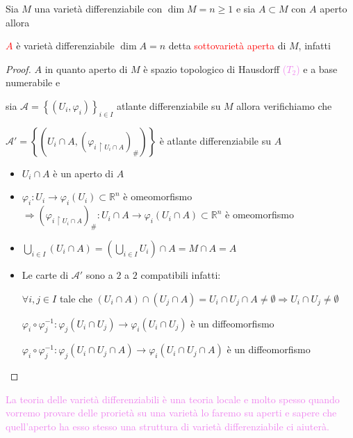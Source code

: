         \begin{esempio}
        \mbox{}

        Sia $M$ una varietà differenziabile con $\dim M =n \geq 1$ e sia $A \subset M$ con $A$ aperto allora 

        \textcolor{red}{$A$} è varietà differenziabile $\dim A = n$ detta \textcolor{red}{sottovarietà aperta} di $M$, infatti

        \begin{proof}
        \mbox{}

        $A$ in quanto aperto di $M$ è spazio topologico di Hausdorff \textcolor{violet}{($T_2$)} e a base numerabile e
        
        sia $\mathcal{A}=\left\{(U_i, \varphi_i)\right\}_{i \in I}$ atlante differenziabile su $M$ allora verifichiamo che
        
        $\mathcal{A}'= \left\{\left(U_i \cap A , (\varphi_{i \, \restriction U_i \cap A} )_\# \right) \right\}$ è atlante differenziabile su $A$
        \begin{itemize}
            \item $U_i \cap A$ è un aperto di $A$
            \item $\varphi_i \colon U_i \to \varphi_i (U_i) \subset \mathbb{R}^n$ è omeomorfismo $\Rightarrow \left( \varphi_{i \, \restriction U_i \cap A}  \right)_\# \colon U_i \cap A \to \varphi_i (U_i \cap A) \subset \mathbb{R}^n$
            è omeomorfismo
            \item $\displaystyle \bigcup_{i \in I} (U_i \cap A) = \left( \bigcup_{i \in I} U_i \right) \cap A = M \cap A =A$
            \item Le carte di $\mathcal{A}'$ sono a $2$ a $2$ compatibili infatti: 
            
            $\forall i ,j \in I $ tale che $\left(U_i \cap A\right)\cap \left(U_j \cap A\right) =U_i \cap U_j \cap A \neq \emptyset \Rightarrow U_i \cap U_j \neq \emptyset$
            
            $\varphi_i \circ \varphi_j^{-1} \colon \varphi_j (U_i \cap U_j) \to \varphi_i (U_i \cap U_j)$ è un diffeomorfismo

            $\varphi_i \circ \varphi_j^{-1} \colon \varphi_j (U_i \cap U_j \cap A) \to \varphi_i (U_i \cap U_j \cap A)$ è un diffeomorfismo
        \end{itemize}
        \end{proof}
        \end{esempio}
        \textcolor{violet}{La teoria delle varietà differenziabili è una teoria locale e molto spesso quando vorremo provare delle prorietà 
        su una varietà lo faremo su aperti e sapere che quell'aperto ha esso stesso una struttura di varietà differenziabile ci aiuterà.}

